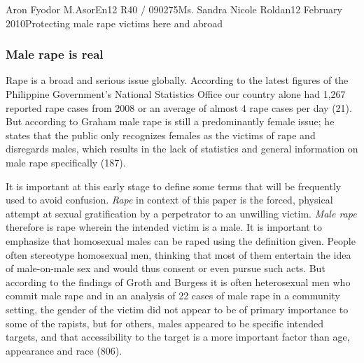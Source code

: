 \documentclass[12pt,letterpaper]{article}
\begin{document}
\begin{mla}{Aron Fyodor M.}{Asor}{En12 R40 / 090275}{Ms. Sandra Nicole Roldan}{12 February 2010}{Protecting male rape victims here and abroad}

\subsubsection{Male rape is real}
%
%
\tab Rape is a broad and serious issue globally. According to the latest figures of the Philippine Government's National Statistics Office our country alone had 1,267 reported rape cases from 2008 or an average of almost 4 rape cases per day (21). But according to Graham male rape is still a predominantly female issue; he states that the public only recognizes females as the victims of rape and disregards males, which results in the lack of statistics and general information on male rape specifically (187).

%
%
It is important at this early stage to define some terms that will be frequently used to avoid confusion. \textit{Rape} in context of this paper is the forced, physical attempt at sexual gratification by a perpetrator to an unwilling victim. \textit{Male rape} therefore is rape wherein the intended victim is a male. It is important to emphasize that homosexual males can  be raped using the definition given. People often stereotype homosexual men, thinking that most of them entertain the idea of male-on-male sex and would thus consent or even pursue such acts. But according to the findings of Groth and Burgess it is often heterosexual men who commit male rape and in an analysis of 22 cases of male rape in a community setting, the gender of the victim did not appear to be of primary importance to some of the rapists, but for others, males appeared to be specific intended targets, and that accessibility to the target is a more important factor than age, appearance and race (806).


\end{mla}
\end{document}
